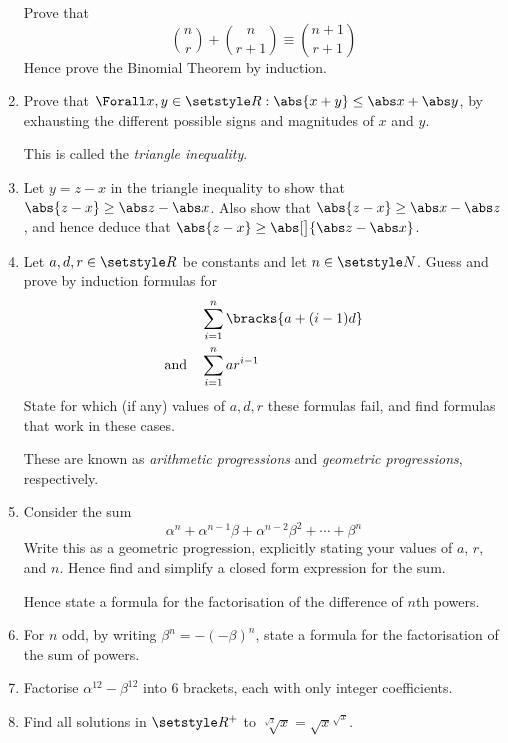 \begin{enumerate}
  Prove that
  \begin{equation*}
   \binom nr + \binom n{r + 1} \equiv \binom{n + 1}{r + 1}
  \end{equation*}
  Hence prove the Binomial Theorem by induction.
 \item
  Prove that \(\Forall x, y \in \Reals : \abs{x + y} \le \abs x + \abs y\), by
  exhausting the different possible signs and magnitudes of \(x\) and \(y\).

  This is called the \emph{triangle inequality}.
 \item
  Let \(y = z - x\) in the triangle inequality to show that
  \(\abs{z - x} \ge \abs z - \abs x\). Also show that
  \(\abs{z - x} \ge \abs x - \abs z\), and hence deduce that
  \(\abs{z - x} \ge \abs[\big]{\abs z - \abs x}\).
 \item
  Let \(a, d, r \in \Reals\) be constants and let \(n \in \Naturals\).
  Guess and prove by induction formulas for
  \begin{align*}
   &\sum_{i = 1}^n \bracks{a + (i - 1)d} \\
   \text{and}\quad&\sum_{i = 1}^n ar^{i - 1}
  \end{align*}
  State for which (if any) values of \(a, d, r\) these formulas fail, and find
  formulas that work in these cases.

  These are known as \emph{arithmetic progressions} and
  \emph{geometric progressions}, respectively.
 \item
  Consider the sum
  \begin{equation*}
   \alpha^n + \alpha^{n - 1}\beta + \alpha^{n - 2}\beta^2 + \dotsb + \beta^n
  \end{equation*}
  Write this as a geometric progression, explicitly stating your values of
  \(a\), \(r\), and \(n\). Hence find and simplify a closed form expression for
  the sum.

  Hence state a formula for the factorisation of the difference of \(n\)th
  powers.
 \item
  For \(n\) odd, by writing \(\beta^n = -(-\beta)^n\), state a formula for the
  factorisation of the sum of powers.
 \item
  Factorise \(\alpha^{12} - \beta^{12}\) into 6 brackets, each with only integer
  coefficients.
 \item
  Find all solutions in \(\Reals^+\) to
  \(\sqrt[\sqrt x]x = {\sqrt x}^{\sqrt x}\).


\end{enumerate}
